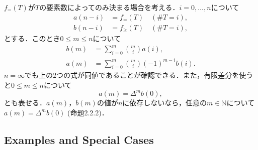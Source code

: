 \documentclass[xelatex,ja=standard,a4paper,14pt,everyparhook=compat]{bxjsarticle}
\newcommand{\bbN}{\mathbb{N}}
\theoremstyle{definition}
\begin{document}
$f_=(T)$が$T$の要素数によってのみ決まる場合を考える．$i=0, \ldots, n$について \begin{align*}
    a(n-i) & = f_=(T) \quad (\#T = i),    \\
    b(n-i) & = f_\geq(T) \quad (\#T = i),
\end{align*}
とする．このとき$0 \leq m \leq n$について \begin{align*}
    b(m) & = \sum_{i=0}^m \binom{m}{i} a(i),            \\
    a(m) & = \sum_{i=0}^m \binom{m}{i} (-1)^{m-i} b(i).
\end{align*}
$n = \infty$でも上の$2$つの式が同値であることが確認できる．また，有限差分を使うと$0 \leq m \leq n$について \begin{equation*}
    a(m) = \Delta^m b(0),
\end{equation*}
とも表せる．$a(m)$，$b(m)$の値が$n$に依存しないなら，任意の$m \in \bbN$について$a(m) = \Delta^m b(0)$ (命題2.2.2)．

\subsection{Examples and Special Cases}
\end{document}
